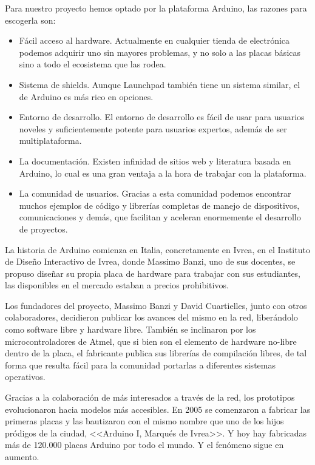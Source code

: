 Para nuestro proyecto hemos optado por la plataforma Arduino, las razones para escogerla son:
\begin{itemize}
\item Fácil acceso al hardware. Actualmente en cualquier tienda de electrónica podemos adquirir uno sin mayores problemas, y no solo a las placas básicas sino a todo el ecosistema que las rodea.
\item Sistema de shields. Aunque Launchpad también tiene un sistema similar, el de Arduino es más rico en opciones.
\item Entorno de desarrollo. El entorno de desarrollo es fácil de usar para usuarios noveles y suficientemente potente para usuarios expertos, además de ser multiplataforma.
\item La documentación. Existen infinidad de sitios web y literatura basada en Arduino, lo cual es una gran ventaja a la hora de trabajar con la plataforma.
\item La comunidad de usuarios. Gracias a esta comunidad podemos encontrar muchos ejemplos de código y librerías completas de manejo de dispositivos, comunicaciones y demás, que facilitan y aceleran enormemente el desarrollo de proyectos.
\end{itemize}




La historia de Arduino comienza en Italia, concretamente en Ivrea, en el Instituto de Diseño Interactivo de Ivrea, donde Massimo Banzi, uno de sus docentes, se propuso diseñar su propia placa de hardware para trabajar con sus estudiantes, las disponibles en el mercado estaban a precios prohibitivos. 



Los fundadores del proyecto, Massimo Banzi y David Cuartielles, junto con otros colaboradores, decidieron publicar los avances del mismo en la red, liberándolo como software libre y hardware libre. También se inclinaron por los microcontroladores de Atmel, que si bien son el elemento de hardware no-libre dentro de la placa, el fabricante publica sus librerías de compilación libres, de tal forma que resulta fácil para la comunidad portarlas a diferentes sistemas operativos.



Gracias a la colaboración de más interesados a través de la red, los prototipos evolucionaron hacia modelos más accesibles. En 2005 se comenzaron a fabricar las primeras placas y las bautizaron con el mismo nombre que uno de los hijos pródigos de la ciudad, <<Arduino I, Marqués de Ivrea>>. Y hoy hay fabricadas más de 120.000 placas Arduino por todo el mundo. Y el fenómeno sigue en aumento.




